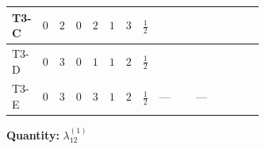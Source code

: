 \documentclass[8pt]{article}
\begin{document}
\begin{landscape}
\begin{longtable}{@{}llcccccc >{\raggedright\arraybackslash}p{0.21\linewidth} >{\raggedright\arraybackslash}p{0.21\linewidth} >{\raggedright\arraybackslash}p{0.21\linewidth}@{}}
\midrule
T3-C & $0$ & $2$ & $0$ & $2$ & $1$ & $3$ & $\frac{1}{2}$ & \scriptsize\adjustbox{max width=\linewidth}{$\begin{gathered} -9 {g_2}^2 {\lambda_{12}^{(1)}}\end{gathered}$} & \scriptsize\adjustbox{max width=\linewidth}{$\begin{gathered} -6 {g_1}^2 {\lambda_{12}^{(1)}}\end{gathered}$} & \scriptsize\adjustbox{max width=\linewidth}{$\begin{gathered} +4 {\lambda_{12}^{(1)}}^2\end{gathered}$} \\
\midrule
T3-D & $0$ & $3$ & $0$ & $1$ & $1$ & $2$ & $\frac{1}{2}$ & \scriptsize\adjustbox{max width=\linewidth}{$\begin{gathered} -12 {g_2}^2 {\lambda_{12}^{(1)}}\end{gathered}$} & \scriptsize\adjustbox{max width=\linewidth}{$\begin{gathered} -6 {g_1}^2 {\lambda_{12}^{(1)}}\end{gathered}$} & \scriptsize\adjustbox{max width=\linewidth}{$\begin{gathered} +4 {\lambda_{12}^{(1)}}^2\end{gathered}$} \\
\midrule
T3-E & $0$ & $3$ & $0$ & $3$ & $1$ & $2$ & $\frac{1}{2}$ & --- & --- & \scriptsize\adjustbox{max width=\linewidth}{$\begin{gathered} +4 {\lambda_{12}^{(1)}}^2\end{gathered}$} \\
\midrule
\bottomrule
\end{longtable}
\clearpage
\noindent\textbf{Quantity: }$\lambda_{12}^{(1)}$\par\smallskip

\end{landscape}
\end{document}
